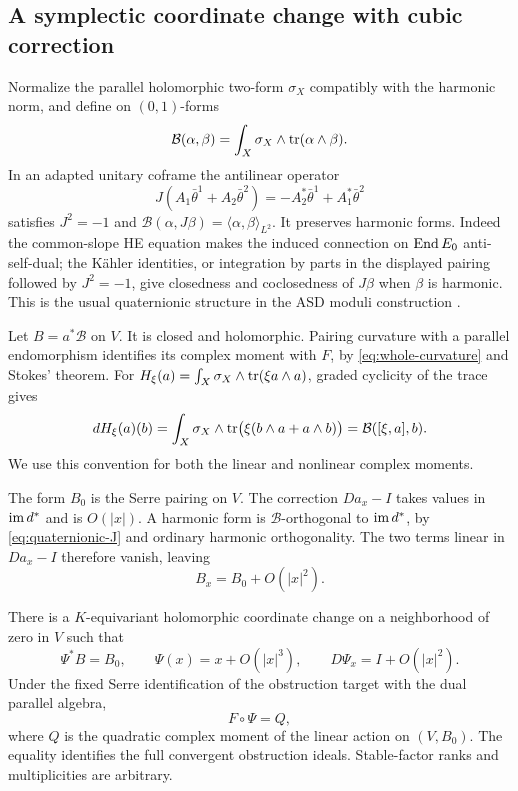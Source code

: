 \subsection{A symplectic coordinate change with cubic correction}
Normalize the parallel holomorphic two-form $\sigma_X$ compatibly
with the harmonic norm, and define on $(0,1)$-forms
\[
 \mathcal B(\alpha,\beta)=
 \int_X\sigma_X\wedge\operatorname{tr}(\alpha\wedge\beta).
\]
In an adapted unitary coframe the antilinear operator
\begin{equation}\label{eq:quaternionic-J}
 J(A_1\bar\theta^1+A_2\bar\theta^2)
   =-A_2^*\bar\theta^1+A_1^*\bar\theta^2
\end{equation}
satisfies $J^2=-1$ and
$\mathcal B(\alpha,J\beta)=\langle\alpha,\beta\rangle_{L^2}$.
It preserves harmonic forms. Indeed the common-slope HE equation
makes the induced connection on $\operatorname{End} E_0$ anti-self-dual; the
K\"ahler identities, or integration by parts in the displayed
pairing followed by $J^2=-1$, give closedness and coclosedness of
$J\beta$ when $\beta$ is harmonic. This is the usual quaternionic
structure in the ASD moduli construction \cite{itoh}.

Let $B=a^*\mathcal B$ on $V$. It is closed and holomorphic.
Pairing curvature with a parallel endomorphism identifies its
complex moment with $F$, by \eqref{eq:whole-curvature} and Stokes'
theorem. For
$H_\xi(a)=\int_X\sigma_X\wedge\operatorname{tr}(\xi a\wedge a)$,
graded cyclicity of the trace gives
\[
 dH_\xi(a)(b)=\int_X\sigma_X\wedge
       \operatorname{tr}\bigl(\xi(b\wedge a+a\wedge b)\bigr)
       =\mathcal B([\xi,a],b).
\]
We use this convention for both the linear and nonlinear complex
moments.

The form $B_0$ is the Serre pairing on $V$. The correction
$D a_x-I$ takes values in $\operatorname{im} d^*$ and is $O(|x|)$. A harmonic
form is $\mathcal B$-orthogonal to $\operatorname{im} d^*$, by
\eqref{eq:quaternionic-J} and ordinary harmonic orthogonality.
The two terms linear in $Da_x-I$ therefore vanish, leaving
\begin{equation}\label{eq:symplectic-quadratic-error}
 B_x=B_0+O(|x|^2).
\end{equation}

\begin{proposition}\label{prop:symplectic-normal-form}
There is a $K$-equivariant holomorphic coordinate change on a
neighborhood of zero in $V$ such that
\begin{equation}\label{eq:cubic-darboux}
 \Psi^*B=B_0,\qquad
 \Psi(x)=x+O(|x|^3),\qquad D\Psi_x=I+O(|x|^2).
\end{equation}
Under the fixed Serre identification of the obstruction target with
the dual parallel algebra,
\[
 F\circ\Psi=Q,
\]
where $Q$ is the quadratic complex moment of the linear action on
$(V,B_0)$. The equality identifies the full convergent obstruction
ideals. Stable-factor ranks and multiplicities are arbitrary.
\end{proposition}

